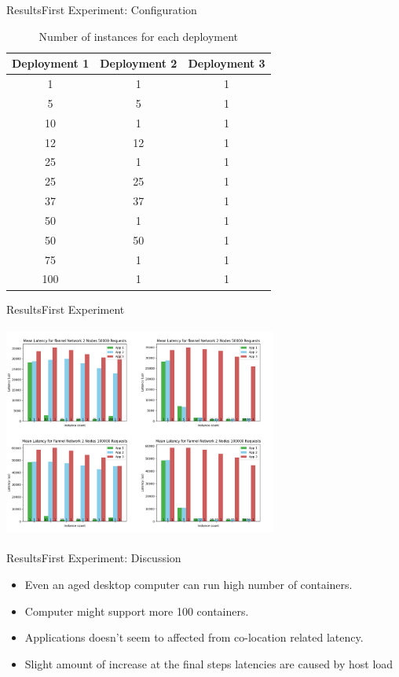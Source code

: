 \documentclass{beamer}
\begin{document}
\begin{frame}{Results}{First Experiment: Configuration}
  \begin{table}[h]
    \caption{Number of instances for each deployment}
    \centering
    \begin{tabular}{ccc}
    Deployment 1 & Deployment 2 & Deployment 3 \\
    \hline
    1 & 1 & 1 \\
    5 & 5 & 1 \\
    10 & 1 & 1 \\
    12 & 12 & 1 \\
    25 & 1 & 1 \\
    25 & 25 & 1 \\
    37 & 37 & 1 \\
    50 & 1 & 1 \\
    50 & 50 & 1 \\
    75 & 1 & 1 \\
    100 & 1 & 1 \\
    \hline
    \end{tabular}
  \end{table}
\end{frame}

\begin{frame}{Results}{First Experiment}
  \begin{center}
   \includegraphics[height=7cm, width=9cm]{figures/flannel.png}
  \end{center}
\end{frame}

\begin{frame}{Results}{First Experiment: Discussion}
 \begin{itemize}
  \item Even an aged desktop computer can run high number of containers.
  \item Computer might support more 100 containers.
  \item Applications doesn't seem to affected from co-location related latency.
  \item Slight amount of increase at the final steps latencies are caused by host load
 \end{itemize}
\end{frame}
\end{document}
